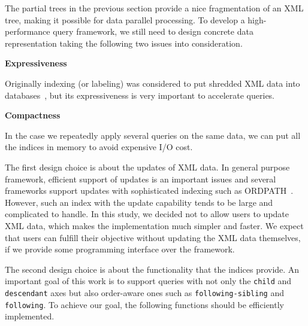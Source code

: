 The partial trees in the previous section provide a nice fragmentation of an XML
tree, making it possible for data parallel processing. To develop a
high-performance query framework, we still need to design concrete data
representation taking the following two issues into consideration.

\textbf{Expressiveness}

Originally indexing (or labeling) was considered to put shredded XML data into
databases~\cite{BGvM06,OOPC04}, but its expressiveness is very important to
accelerate queries.

\textbf{Compactness}

In the case we repeatedly apply several queries on the same data, we can put all
the indices in memory to avoid expensive I/O cost.

The first design choice is about the updates of XML data. In general purpose
framework, efficient support of updates is an important issues and several
frameworks support updates with sophisticated indexing such as
ORDPATH~\cite{OOPC04}. However, such an index with the update capability tends
to be large and complicated to handle. In this study, we decided not to allow
users to update XML data, which makes the implementation much simpler and
faster. We expect that users can fulfill their objective without updating the
XML data themselves,  if we provide some programming interface over the
framework.

The second design choice is about the functionality that the indices provide. An
important goal of this work is to support queries with not only the
\texttt{child} and \texttt{descendant} axes but also order-aware ones such as
\texttt{following-sibling} and \texttt{following}. To achieve our goal, the
following functions should be efficiently implemented.

